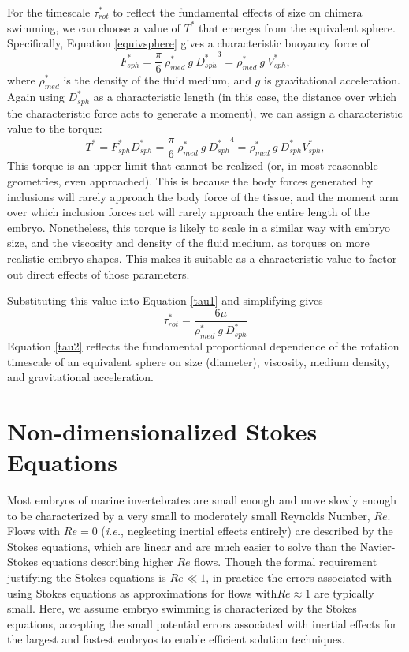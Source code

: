 \documentclass[10pt,a4paper]{article}
\begin{document}
For the timescale $\tau^*_{rot}$ to reflect the fundamental effects of size on chimera swimming, we can choose a value of $T^*$ that emerges from the equivalent sphere.
Specifically, Equation \ref{equivsphere} gives a characteristic buoyancy force of
\begin{equation}\label{charF}
	F_{sph}^* = \frac{\pi}{6} ~ \rho_{med}^* ~ g ~ {D_{sph}^*}^3 = \rho_{med}^* ~ g ~ V_{sph}^*,
\end{equation} 
where $\rho_{med}^*$ is the density of the fluid medium, and $g$ is gravitational acceleration.
Again using $D_{sph}^*$ as a characteristic length (in this case, the distance over which the characteristic force acts to generate a moment), we can assign a characteristic value to the torque:
\begin{equation}\label{charT}
	T^* = F_{sph}^* D_{sph}^* = \frac{\pi}{6} ~ \rho_{med}^* ~ g ~ {D_{sph}^*}^4 = \rho_{med}^* ~ g ~ D_{sph}^* V_{sph}^*,
\end{equation} 
This torque is an upper limit that cannot be realized (or, in most reasonable geometries, even approached).
This is because the body forces generated by inclusions will rarely approach the body force of the tissue, and the moment arm over which inclusion forces act will rarely approach the entire length of the embryo. 
Nonetheless, this torque is likely to scale in a similar way with embryo size, and the viscosity and density of the fluid medium, as torques on more realistic embryo shapes. This makes it suitable as a characteristic value to factor out direct effects of those parameters.

Substituting this value into Equation \ref{tau1} and simplifying gives
\begin{equation}\label{tau2}
	\tau^*_{rot} = \frac{6 \mu}{\rho^*_{med} ~ g ~ D_{sph}^*}
\end{equation}
Equation \ref{tau2} reflects the fundamental proportional dependence of the rotation timescale of an equivalent sphere on size (diameter), viscosity, medium density, and gravitational acceleration.


\section{Non-dimensionalized Stokes Equations}\label{NDStokesSect}
Most embryos of marine invertebrates are small enough and move slowly enough to be characterized by a very small to moderately small Reynolds Number, $Re$. 
Flows with $Re = 0$ (\textit{i.e.}, neglecting inertial effects entirely) are described by the Stokes equations, which are linear and are much easier to solve than the Navier-Stokes equations describing higher $Re$ flows.
Though the formal requirement justifying the Stokes equations is $Re \ll 1$, in practice the errors associated with using Stokes equations as approximations for flows with$Re \approx 1$ are typically small.
Here, we assume embryo swimming is characterized by the Stokes equations, accepting the small potential errors associated with inertial effects for the largest and fastest embryos to enable efficient solution techniques.
\end{document}
